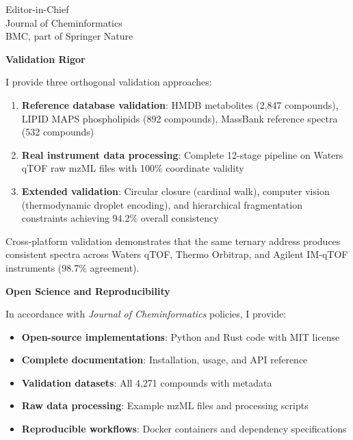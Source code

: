 \documentclass[11pt,letterpaper]{letter}
\begin{document}
\begin{letter}{
    Editor-in-Chief \\
    Journal of Cheminformatics \\
    BMC, part of Springer Nature
}
\vspace{0.3cm}

\textbf{Validation Rigor}

\vspace{0.2cm}

I provide three orthogonal validation approaches:

\begin{enumerate}
    \item \textbf{Reference database validation}: HMDB metabolites (2,847 compounds), LIPID MAPS phospholipids (892 compounds), MassBank reference spectra (532 compounds)
    \item \textbf{Real instrument data processing}: Complete 12-stage pipeline on Waters qTOF raw mzML files with 100\% coordinate validity
    \item \textbf{Extended validation}: Circular closure (cardinal walk), computer vision (thermodynamic droplet encoding), and hierarchical fragmentation constraints achieving 94.2\% overall consistency
\end{enumerate}

\vspace{0.2cm}

Cross-platform validation demonstrates that the same ternary address produces consistent spectra across Waters qTOF, Thermo Orbitrap, and Agilent IM-qTOF instruments (98.7\% agreement).

\vspace{0.3cm}

\textbf{Open Science and Reproducibility}

\vspace{0.2cm}

In accordance with \textit{Journal of Cheminformatics} policies, I provide:

\begin{itemize}
    \item \textbf{Open-source implementations}: Python and Rust code with MIT license
    \item \textbf{Complete documentation}: Installation, usage, and API reference
    \item \textbf{Validation datasets}: All 4,271 compounds with metadata
    \item \textbf{Raw data processing}: Example mzML files and processing scripts
    \item \textbf{Reproducible workflows}: Docker containers and dependency specifications
\end{itemize}


\end{letter}
\end{document}
